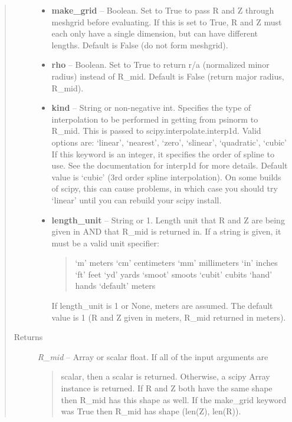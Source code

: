 \documentclass[letterpaper,10pt,english]{sphinxmanual}
\begin{document}
\begin{fulllineitems}
\begin{fulllineitems}
\begin{quote}
\begin{description}
\begin{itemize}
\item {} 
\textbf{make\_grid} --
Boolean. Set to True to pass R and Z through meshgrid
before evaluating. If this is set to True, R and Z must each
only have a single dimension, but can have different lengths.
Default is False (do not form meshgrid).

\item {} 
\textbf{rho} --
Boolean. Set to True to return r/a (normalized minor radius)
instead of R\_mid. Default is False (return major radius, R\_mid).

\item {} 
\textbf{kind} --
String or non-negative int. Specifies the type of interpolation
to be performed in getting from psinorm to R\_mid. This is
passed to scipy.interpolate.interp1d. Valid options are:
`linear', `nearest', `zero', `slinear', `quadratic', `cubic'
If this keyword is an integer, it specifies the order of spline
to use. See the documentation for interp1d for more details.
Default value is `cubic' (3rd order spline interpolation). On
some builds of scipy, this can cause problems, in which case
you should try `linear' until you can rebuild your scipy install.

\item {} 
\textbf{length\_unit} --
String or 1. Length unit that R and Z are being given
in AND that R\_mid is returned in. If a string is given, it
must be a valid unit specifier:
\begin{quote}

`m'         meters
`cm'        centimeters
`mm'        millimeters
`in'        inches
`ft'        feet
`yd'        yards
`smoot'     smoots
`cubit'     cubits
`hand'      hands
`default'   meters
\end{quote}

If length\_unit is 1 or None, meters are assumed. The default
value is 1 (R and Z given in meters, R\_mid returned in meters).

\end{itemize}

\item[{Returns}] \leavevmode

\emph{R\_mid} --
Array or scalar float. If all of the input arguments are
\begin{quote}

scalar, then a scalar is returned. Otherwise, a scipy Array
instance is returned. If R and Z both have the same shape then
R\_mid has this shape as well. If the make\_grid keyword was True
then R\_mid has shape (len(Z), len(R)).
\end{quote}



\end{description}
\end{quote}
\end{fulllineitems}
\end{fulllineitems}
\end{document}

